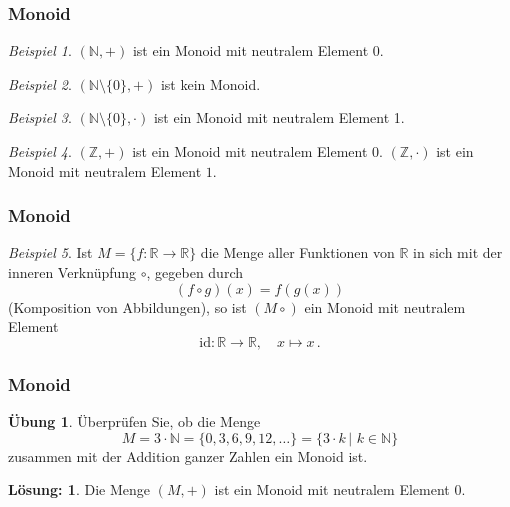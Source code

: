 \documentclass[hyperref={pdfpagelabels=false}]{beamer}
\theoremstyle{plain}%
\theoremstyle{definition}
\newtheorem*{uebung}{Übung}
\newtheorem*{sol}{Lösung:}
\theoremstyle{remark}
\newtheorem*{beispiel}{Beispiel}
\def \R{\mathbb R}
\def \N{\mathbb N}
\begin{document}
\begin{frame}
\frametitle{Monoid}

\begin{beispiel} $(\mathbb N, +)$ ist ein Monoid mit neutralem Element 0. \end{beispiel}

\pause
\begin{beispiel} $(\mathbb N \setminus \{ 0 \}, +)$ ist kein Monoid. \end{beispiel}

\pause
\begin{beispiel} $(\mathbb N \setminus \{ 0 \}, \cdot)$ ist ein Monoid mit neutralem Element 1.
\end{beispiel}

\pause
\begin{beispiel} $(\mathbb Z, +)$ ist ein Monoid mit neutralem Element 0. 
$(\mathbb Z, \cdot)$ ist ein Monoid mit neutralem Element $1$. \end{beispiel}

\end{frame}

\begin{frame}
\frametitle{Monoid}

\begin{beispiel} Ist $M = \{f: \mathbb R \longrightarrow \mathbb R \}$ die Menge aller Funktionen 
von $\R$ in sich mit der inneren Verknüpfung $\circ$, gegeben durch 
 	$$ (f \circ g)(x) = f(g(x)) $$
(Komposition von Abbildungen), so ist $(M \circ)$ ein Monoid mit neutralem Element 
 	$$ \mathrm{id}: \mathbb R \longrightarrow \mathbb R, \quad x \longmapsto x \, . $$
\end{beispiel}

\end{frame}

\begin{frame}
\frametitle{Monoid}

\begin{uebung}
Überprüfen Sie, ob die Menge 
	$$ M = 3 \cdot \N = \{0, 3, 6, 9, 12, \ldots \} =\{ 3 \cdot k \, \vert \,\, k \in \N \} $$
zusammen mit der Addition ganzer Zahlen ein Monoid ist. 
\end{uebung}

\pause \pause 

\bigbreak

\begin{sol} 
Die Menge $(M,+)$ ist ein Monoid mit neutralem Element $0$. 
\end{sol}

\end{frame}
\end{document}
